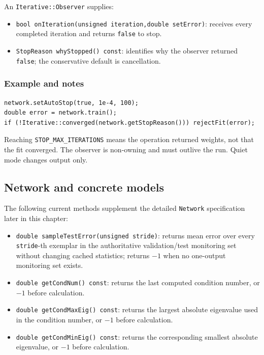 An \texttt{Iterative::Observer} supplies:

\begin{itemize}
\item \texttt{bool onIteration(unsigned iteration,double setError)}: receives
      every completed iteration and returns \texttt{false} to stop.
\item \texttt{StopReason whyStopped() const}: identifies why the observer
      returned \texttt{false}; the conservative default is cancellation.
\end{itemize}

\subsubsection{Example and notes}
\begin{verbatim}
network.setAutoStop(true, 1e-4, 100);
double error = network.train();
if (!Iterative::converged(network.getStopReason())) rejectFit(error);
\end{verbatim}
Reaching \texttt{STOP\_MAX\_ITERATIONS} means the operation returned weights,
not that the fit converged.  The observer is non-owning and must outlive the run.
Quiet mode changes output only.

\subsection{Network and concrete models}
The following current methods supplement the detailed \texttt{Network}
specification later in this chapter:

\begin{itemize}
\item \texttt{double sampleTestError(unsigned stride)}: returns mean error over
      every \texttt{stride}-th exemplar in the authoritative validation/test
      monitoring set without changing cached statistics; returns $-1$ when no
      one-output monitoring set exists.
\item \texttt{double getCondNum() const}: returns the last computed condition
      number, or $-1$ before calculation.
\item \texttt{double getCondMaxEig() const}: returns the largest absolute
      eigenvalue used in the condition number, or $-1$ before calculation.
\item \texttt{double getCondMinEig() const}: returns the corresponding smallest
      absolute eigenvalue, or $-1$ before calculation.
\end{itemize}

